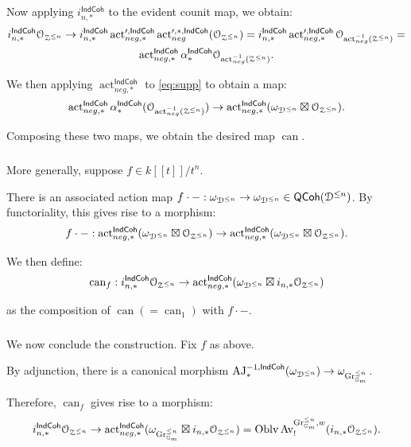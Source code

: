 \documentclass[reqno,11pt]{amsart}
\numberwithin{equation}{subsection}
\theoremstyle{remark}
\newcommand{\bG}{{\mathbb G}}
\newcommand{\sD}{{\EuScript D}}
\newcommand{\sO}{{\EuScript O}}
\newcommand{\sZ}{{\EuScript Z}}
\newcommand{\on}{\operatorname}
\newcommand{\act}{\on{act}}
\newcommand{\Gr}{\on{Gr}}
\newcommand{\Oblv}{\on{Oblv}}
\newcommand{\Av}{\on{Av}}
\newcommand{\IndCoh}{\mathsf{IndCoh}}
\newcommand{\QCoh}{\mathsf{QCoh}}
\newcommand{\AJ}{\on{AJ}}
\begin{document}
Now applying $i_{n,*}^{\IndCoh}$
to the evident counit map, we obtain:
%
\[
\begin{gathered}
i_{n,*}^{\IndCoh}\sO_{\sZ^{\leq n}} \to 
i_{n,*}^{\IndCoh} \act_{neg,*}^{\prime,\IndCoh}
\act_{neg}^{\prime,*,\IndCoh}(\sO_{\sZ^{\leq n}}) = 
i_{n,*}^{\IndCoh} \act_{neg,*}^{\prime,\IndCoh}
\sO_{\act_{neg}^{-1}(\sZ^{\leq n})} = \\
\act_{neg,*}^{\IndCoh} \alpha_*^{\IndCoh}
\sO_{\act_{neg}^{-1}(\sZ^{\leq n})}.
\end{gathered}
\]

\noindent We then applying $\act_{neg,*}^{\IndCoh}$
to \eqref{eq:supp} to obtain a map:
%
\[
\act_{neg,*}^{\IndCoh}\alpha_*^{\IndCoh}
(\sO_{\act_{neg}^{-1}(\sZ^{\leq n})}) \to 
\act_{neg,*}^{\IndCoh}
(\omega_{\sD^{\leq n}} \boxtimes \sO_{\sZ^{\leq n}}).
\]

\noindent Composing these two maps, we obtain
the desired map $\on{can}$.

\subsubsection{}

More generally, suppose $f \in k[[t]]/t^n$.

There is an associated action map 
$f\cdot -:\omega_{\sD^{\leq n}} \to 
\omega_{\sD^{\leq n}} \in \QCoh(\sD^{\leq n})$.
By functoriality, this gives rise to a morphism:
%
\[
f\cdot-:\act_{neg,*}^{\IndCoh}
(\omega_{\sD^{\leq n}} \boxtimes \sO_{\sZ^{\leq n}})
\to \act_{neg,*}^{\IndCoh}
(\omega_{\sD^{\leq n}} \boxtimes \sO_{\sZ^{\leq n}}).
\]

We then define: 
%
\[
\on{can}_f:
i_{n,*}^{\IndCoh}\sO_{\sZ^{\leq n}} \to 
\act_{neg,*}^{\IndCoh}
(\omega_{\sD^{\leq n}} \boxtimes 
i_{n,*}\sO_{\sZ^{\leq n}})
\]

\noindent as the composition of $\on{can} (= \on{can}_1)$
with $f\cdot-$.

\subsubsection{}

We now conclude the construction. 
Fix $f$ as above.

By adjunction,
there is a canonical morphism
$\AJ_*^{-1,\IndCoh}(\omega_{\sD^{\leq n}}) \to 
\omega_{\Gr_{\bG_m}^{\leq n}}$. 

Therefore, $\on{can}_f$ gives rise to a morphism:
%
\[
i_{n,*}^{\IndCoh}\sO_{\sZ^{\leq n}} \to 
\act_{neg,*}^{\IndCoh}
(\omega_{\Gr_{\bG_m}^{\leq n}} \boxtimes 
i_{n,*}\sO_{\sZ^{\leq n}}) = 
\Oblv\Av_!^{\Gr_{\bG_m}^{\leq n},w} 
(i_{n,*}\sO_{\sZ^{\leq n}}).
\]
\end{document}
